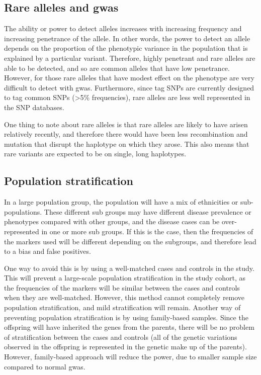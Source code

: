 \subsection{Rare alleles and \gls{gwas}}
\label{ssub:rare_alleles_and_gwas}

The ability or power to detect alleles increases with increasing frequency and increasing penetrance of the allele.
In other words,  the power to detect an allele depends on the proportion of the phenotypic variance in the population that is explained by a particular variant.
Therefore, highly penetrant and rare alleles are able to be detected, and so are common alleles that have low penetrance.
However, for those rare alleles that have modest effect on the phenotype are very difficult to detect with \gls{gwas}.
Furthermore, since tag SNPs are currently designed to tag common SNPs (\textgreater{}5\% frequencies), rare alleles are less well represented in the SNP databases.

One thing to note about rare alleles is that rare alleles are likely to have arisen relatively recently, and therefore there would have been less recombination and mutation that disrupt the haplotype on which they arose.
This also means that rare variants are expected to be on single, long haplotypes.

\subsection{Population stratification}
\label{sub:population_stratification}

In a large population group, the population will have a mix of ethnicities or sub-populations.
These different sub groups may have different disease prevalence or phenotypes compared with other groups, and the disease cases can be over-represented in one or more sub groups.
If this is the case, then the frequencies of the markers used will be different depending on the subgroups, and therefore lead to a bias and false positives.

One way to avoid this is by using a well-matched cases and  controls in the study.
This will prevent a large-scale population stratification in the study cohort, as the frequencies of the markers will be similar between the cases and controls when they are well-matched.
However, this method cannot completely remove population stratification, and mild stratification will remain.
Another way of preventing population stratification is by using family-based samples.
Since the offspring will have inherited the genes from the parents, there will be no problem of stratification between the cases and controls (all of the genetic variations observed in the offspring is represented in the genetic make up of the parents).
However, family-based approach will reduce the power, due to smaller sample size compared to normal \gls{gwas}.

